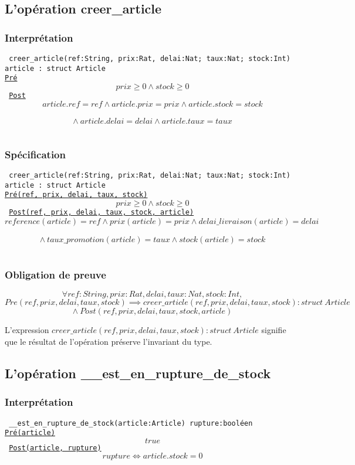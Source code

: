 \documentclass{article}
\begin{document}
\subsection{L'opération creer\_article}
\subsubsection{Interprétation}
{\tt
creer\_article(ref:String, prix:Rat, delai:Nat; taux:Nat; stock:Int)  article : struct Article\\
\underline{Pré}
$$ prix \ge 0 \wedge stock \ge 0$$
\underline{Post}
$$ article.ref = ref \wedge article.prix = prix \wedge article.stock = stock $$
$$  \wedge\ article.delai = delai \wedge article.taux = taux $$
}

\subsubsection{Spécification}
{\tt
creer\_article(ref:String, prix:Rat, delai:Nat; taux:Nat; stock:Int)  article : struct Article\\
\underline{Pré(ref, prix, delai, taux, stock)}
$$ prix \ge 0 \wedge stock \ge 0$$
\underline{Post(ref, prix, delai, taux, stock, article)}
$$ reference(article) = ref \wedge prix(article) = prix \wedge delai\_livraison(article) = delai$$
$$ \wedge\ taux\_promotion(article) = taux \wedge stock(article) = stock$$
}

\subsubsection{Obligation de preuve}
$$ \forall ref:String, prix:Rat, delai,taux:Nat, stock:Int, $$
$$ Pre(ref, prix, delai, taux, stock) \implies creer\_article(ref, prix, delai, taux, stock): struct\ Article $$
$$\wedge\ Post(ref, prix, delai, taux, stock, article) $$

L'expression $creer\_article(ref, prix, delai, taux, stock): struct\ Article$ signifie que le résultat de l'opération préserve l'invariant du type.

\subsection{L'opération \_\_est\_en\_rupture\_de\_stock}
\subsubsection{Interprétation}
{\tt
\_\_est\_en\_rupture\_de\_stock(article:Article)  rupture:booléen\\
\underline{Pré(article)}
$$ true $$
\underline{Post(article, rupture)}
$$ rupture \Leftrightarrow article.stock = 0$$
}
\end{document}
